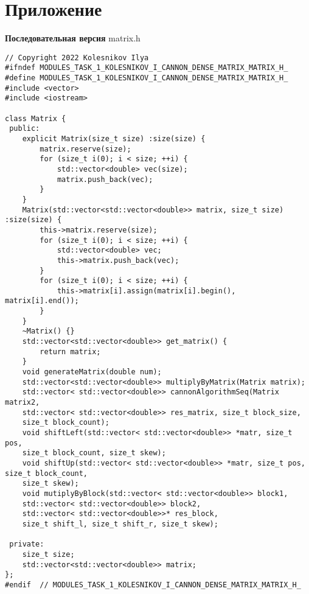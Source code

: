 \documentclass{report}
\begin{document}
\section*{Приложение}
\textbf{Последовательная версия}
\newline
\newline matrix.h
\begin{lstlisting}
// Copyright 2022 Kolesnikov Ilya
#ifndef MODULES_TASK_1_KOLESNIKOV_I_CANNON_DENSE_MATRIX_MATRIX_H_
#define MODULES_TASK_1_KOLESNIKOV_I_CANNON_DENSE_MATRIX_MATRIX_H_
#include <vector>
#include <iostream>

class Matrix {
 public:
    explicit Matrix(size_t size) :size(size) {
        matrix.reserve(size);
        for (size_t i(0); i < size; ++i) {
            std::vector<double> vec(size);
            matrix.push_back(vec);
        }
    }
    Matrix(std::vector<std::vector<double>> matrix, size_t size) :size(size) {
        this->matrix.reserve(size);
        for (size_t i(0); i < size; ++i) {
            std::vector<double> vec;
            this->matrix.push_back(vec);
        }
        for (size_t i(0); i < size; ++i) {
            this->matrix[i].assign(matrix[i].begin(), matrix[i].end());
        }
    }
    ~Matrix() {}
    std::vector<std::vector<double>> get_matrix() {
        return matrix;
    }
    void generateMatrix(double num);
    std::vector<std::vector<double>> multiplyByMatrix(Matrix matrix);
    std::vector< std::vector<double>> cannonAlgorithmSeq(Matrix matrix2,
    std::vector< std::vector<double>> res_matrix, size_t block_size,
    size_t block_count);
    void shiftLeft(std::vector< std::vector<double>> *matr, size_t pos,
    size_t block_count, size_t skew);
    void shiftUp(std::vector< std::vector<double>> *matr, size_t pos, size_t block_count,
    size_t skew);
    void mutiplyByBlock(std::vector< std::vector<double>> block1,
    std::vector< std::vector<double>> block2,
    std::vector< std::vector<double>>* res_block,
    size_t shift_l, size_t shift_r, size_t skew);

 private:
    size_t size;
    std::vector<std::vector<double>> matrix;
};
#endif  // MODULES_TASK_1_KOLESNIKOV_I_CANNON_DENSE_MATRIX_MATRIX_H_
\end{lstlisting}
\end{document}
